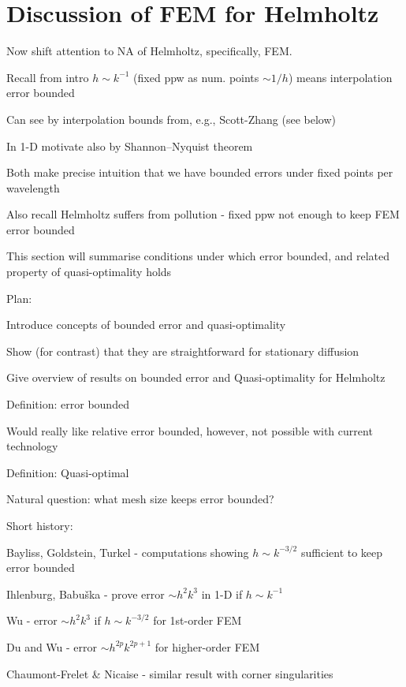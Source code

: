 \section{Discussion of FEM for Helmholtz}
\bit
\item Now shift attention to NA of Helmholtz, specifically, FEM.
\item Recall from intro $h\sim k^{-1}$ (fixed ppw as num. points $\sim 1/h$) means interpolation error bounded
\bit
\item Can see by interpolation bounds from, e.g., Scott-Zhang (see below)
\item In 1-D motivate also by Shannon--Nyquist theorem
\item Both make precise intuition that we have bounded errors under fixed points per wavelength
\eit
\item Also recall Helmholtz suffers from pollution - fixed ppw not enough to keep FEM error bounded
\item This section will summarise conditions under which error bounded, and related property of quasi-optimality holds
\item Plan:
\bit
\item Introduce concepts of bounded error and quasi-optimality
\item Show (for contrast) that they are straightforward for stationary diffusion
\item Give overview of results on bounded error and Quasi-optimality for Helmholtz
\eit
\eit
\bit
\item Definition: error bounded
\item Would really like relative error bounded, however, not possible with current technology
\item Definition: Quasi-optimal
\item Natural question: what mesh size keeps error bounded?
\item Short history:
\bit
\item Bayliss, Goldstein, Turkel - computations showing $h\sim k^{-3/2}$ sufficient to keep error bounded
\item Ihlenburg, Babu\v{s}ka - prove error $\sim h^2k^3$ in 1-D if $h \sim k^{-1}$
\item Wu - error $\sim h^2k^3$ if $h \sim k^{-3/2}$ for 1st-order FEM
\item Du and Wu - error $\sim h^{2p}k^{2p+1}$ for higher-order FEM
\item Chaumont-Frelet \& Nicaise - similar result with corner singularities
